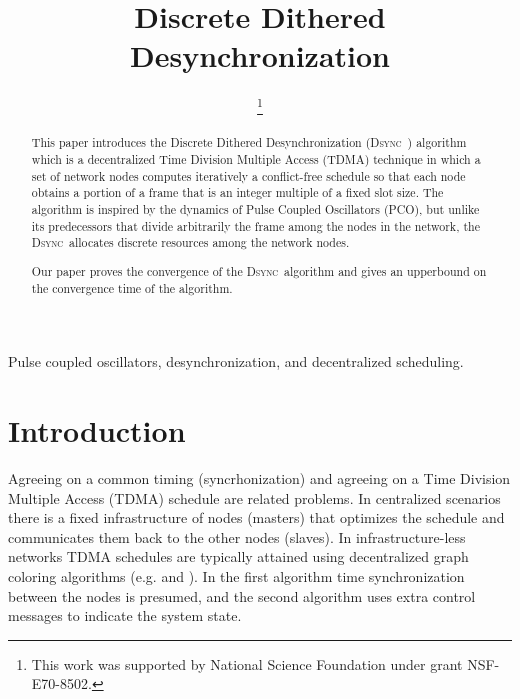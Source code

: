 \documentclass[conference]{IEEEtran}
\newcommand{\DDD}{\textsc{Dsync~}}
\theoremstyle{definition}
\theoremstyle{definition}
\begin{document}
\title{Discrete Dithered Desynchronization}
\author{
\and
{}
\thanks{This work was supported by National Science Foundation under
grant NSF-E70-8502.}
}
\maketitle


\begin{abstract}
This paper introduces the Discrete Dithered Desynchronization (\DDD) algorithm which is a
decentralized Time Division Multiple Access (TDMA) technique in which a set of network 
nodes computes iteratively a conflict-free
schedule so that each node obtains a portion of a frame that is an integer multiple of a fixed
slot size. 
The algorithm is inspired by the dynamics of Pulse Coupled Oscillators (PCO), but unlike its
predecessors that divide arbitrarily the frame among the nodes in the network, the 
\DDD allocates discrete resources among the network nodes.

Our paper proves the convergence of the \DDD algorithm and gives an upperbound on the convergence time
of the algorithm.  
\end{abstract}
\begin{IEEEkeywords}
Pulse coupled oscillators, desynchronization, and decentralized scheduling.
\end{IEEEkeywords}
\section{Introduction}
Agreeing on a common timing (syncrhonization) and agreeing on a Time Division Multiple Access (TDMA) schedule are related problems. In centralized scenarios there is a fixed infrastructure of nodes (masters) that optimizes the schedule and communicates them back to the other nodes (slaves). In infrastructure-less networks TDMA schedules are typically attained using decentralized graph coloring algorithms  (e.g. \cite{herman2004distributed} and \cite{rhee2006drand}). In the first algorithm time synchronization between the nodes is presumed, and the second algorithm uses extra control messages to indicate the system state.  
\end{document}
